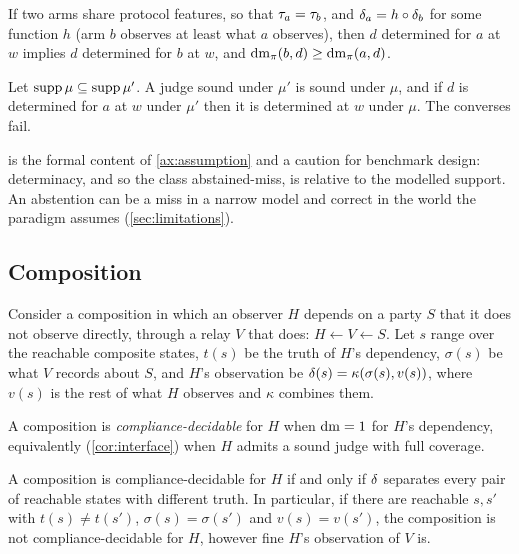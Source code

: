\begin{proposition}[Monotonicity]
\label{prop:monotone}
If two arms share protocol features, so that $\tau_a = \tau_b$, and $\delta_a = h \circ \delta_b$ for some function $h$ (arm $b$ observes at least what $a$ observes), then $d$ determined for $a$ at $w$ implies $d$ determined for $b$ at $w$, and $\operatorname{dm}_\pi(b, d) \geq \operatorname{dm}_\pi(a, d)$.
\end{proposition}

\begin{proposition}
\label{prop:support}
Let $\operatorname{supp}\mu \subseteq \operatorname{supp}\mu'$. A judge sound under $\mu'$ is sound under $\mu$, and if $d$ is determined for $a$ at $w$ under $\mu'$ then it is determined at $w$ under $\mu$. The converses fail.
\end{proposition}

 is the formal content of \cref{ax:assumption} and a caution for benchmark design: determinacy, and so the class abstained-miss, is relative to the modelled support. An abstention can be a miss in a narrow model and correct in the world the paradigm assumes (\cref{sec:limitations}).

\subsection{Composition}

Consider a composition in which an observer $H$ depends on a party $S$ that it does not observe directly, through a relay $V$ that does: $H \leftarrow V \leftarrow S$. Let $s$ range over the reachable composite states, $t(s)$ be the truth of $H$'s dependency, $\sigma(s)$ be what $V$ records about $S$, and $H$'s observation be $\delta(s) = \kappa(\sigma(s), v(s))$, where $v(s)$ is the rest of what $H$ observes and $\kappa$ combines them.

\begin{definition}
A composition is \emph{compliance-decidable} for $H$ when $\operatorname{dm} = 1$ for $H$'s dependency, equivalently (\cref{cor:interface}) when $H$ admits a sound judge with full coverage.
\end{definition}

\begin{theorem}
\label{thm:p2}
A composition is compliance-decidable for $H$ if and only if $\delta$ separates every pair of reachable states with different truth. In particular, if there are reachable $s, s'$ with $t(s) \neq t(s')$, $\sigma(s) = \sigma(s')$ and $v(s) = v(s')$, the composition is not compliance-decidable for $H$, however fine $H$'s observation of $V$ is.
\end{theorem}

